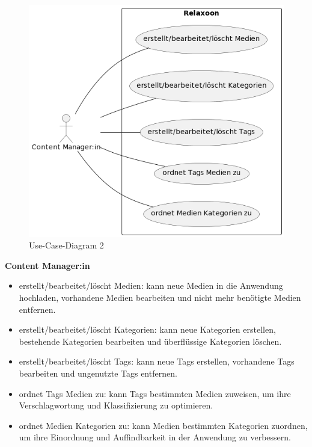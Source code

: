 \begin{figure}[H]
    \centering
    \includegraphics[height=0.84\textwidth]{./pics/ucd2.png}
    \caption{Use-Case-Diagram 2}
\end{figure}







\newpage

\textbf{Content Manager:in}
\begin{itemize}
    \item erstellt/bearbeitet/löscht Medien: kann neue Medien in die Anwendung hochladen, vorhandene Medien bearbeiten und nicht mehr benötigte Medien entfernen.
    \item erstellt/bearbeitet/löscht Kategorien: kann neue Kategorien erstellen, bestehende Kategorien bearbeiten und überflüssige Kategorien löschen.
    \item erstellt/bearbeitet/löscht Tags: kann neue Tags erstellen, vorhandene Tags bearbeiten und ungenutzte Tags entfernen.
    \item ordnet Tags Medien zu: kann Tags bestimmten Medien zuweisen, um ihre Verschlagwortung und Klassifizierung zu optimieren.
    \item ordnet Medien Kategorien zu: kann Medien bestimmten Kategorien zuordnen, um ihre Einordnung und Auffindbarkeit in der Anwendung zu verbessern.
\end{itemize}

